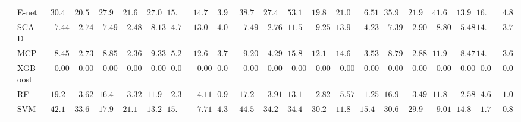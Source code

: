 \begin{tabular}{ll|ll|llllll|llllll|llllll}
 & E-net  & $\phantom{0}30.45$ & $\phantom{0}20.58$ & $\phantom{0}27.98$ & $\phantom{0}21.68$ & $\phantom{0}27.04$ & $15.38$ & $\phantom{0}14.78$ & $\phantom{0}3.95$ & $\phantom{0}38.72$ & $\phantom{0}27.41$ & $\phantom{0}53.16$ & $\phantom{0}19.89$ & $\phantom{0}21.01$ & $\phantom{00}6.51$ & $\phantom{0}35.98$ & $\phantom{0}21.93$ & $\phantom{0}41.61$ & $\phantom{0}13.92$ & $16.97$ & $\phantom{0}4.85$ \\
 & SCAD  & $\phantom{00}7.44$ & $\phantom{00}2.74$ & $\phantom{00}7.49$ & $\phantom{00}2.48$ & $\phantom{00}8.13$ & $\phantom{0}4.71$ & $\phantom{0}13.05$ & $\phantom{0}4.07$ & $\phantom{00}7.49$ & $\phantom{00}2.76$ & $\phantom{0}11.59$ & $\phantom{00}9.25$ & $\phantom{0}13.93$ & $\phantom{00}4.23$ & $\phantom{00}7.39$ & $\phantom{00}2.90$ & $\phantom{00}8.80$ & $\phantom{00}5.48$ & $14.12$ & $\phantom{0}3.79$ \\
 & MCP  & $\phantom{00}8.45$ & $\phantom{00}2.73$ & $\phantom{00}8.85$ & $\phantom{00}2.36$ & $\phantom{00}9.33$ & $\phantom{0}5.25$ & $\phantom{0}12.61$ & $\phantom{0}3.70$ & $\phantom{00}9.20$ & $\phantom{00}4.29$ & $\phantom{0}15.83$ & $\phantom{0}12.14$ & $\phantom{0}14.64$ & $\phantom{00}3.53$ & $\phantom{00}8.79$ & $\phantom{00}2.88$ & $\phantom{0}11.97$ & $\phantom{00}8.47$ & $14.29$ & $\phantom{0}3.68$ \\
 & XGBoost  & $\phantom{00}0.00$ & $\phantom{00}0.00$ & $\phantom{00}0.00$ & $\phantom{00}0.00$ & $\phantom{00}0.00$ & $\phantom{0}0.00$ & $\phantom{00}0.00$ & $\phantom{0}0.00$ & $\phantom{00}0.00$ & $\phantom{00}0.00$ & $\phantom{00}0.00$ & $\phantom{00}0.00$ & $\phantom{00}0.00$ & $\phantom{00}0.00$ & $\phantom{00}0.00$ & $\phantom{00}0.00$ & $\phantom{00}0.00$ & $\phantom{00}0.00$ & $\phantom{0}0.00$ & $\phantom{0}0.00$ \\
 & RF  & $\phantom{0}19.26$ & $\phantom{00}3.62$ & $\phantom{0}16.43$ & $\phantom{00}3.32$ & $\phantom{0}11.97$ & $\phantom{0}2.38$ & $\phantom{00}4.11$ & $\phantom{0}0.94$ & $\phantom{0}17.28$ & $\phantom{00}3.91$ & $\phantom{0}13.17$ & $\phantom{00}2.82$ & $\phantom{00}5.57$ & $\phantom{00}1.25$ & $\phantom{0}16.95$ & $\phantom{00}3.49$ & $\phantom{0}11.83$ & $\phantom{00}2.58$ & $\phantom{0}4.67$ & $\phantom{0}1.06$ \\
 & SVM  & $\phantom{0}42.13$ & $\phantom{0}33.63$ & $\phantom{0}17.95$ & $\phantom{0}21.15$ & $\phantom{0}13.24$ & $15.02$ & $\phantom{00}7.71$ & $\phantom{0}4.36$ & $\phantom{0}44.52$ & $\phantom{0}34.25$ & $\phantom{0}34.41$ & $\phantom{0}30.21$ & $\phantom{0}11.86$ & $\phantom{0}15.46$ & $\phantom{0}30.65$ & $\phantom{0}29.90$ & $\phantom{00}9.01$ & $\phantom{0}14.85$ & $\phantom{0}1.75$ & $\phantom{0}0.85$ \\\hline

\end{tabular}
